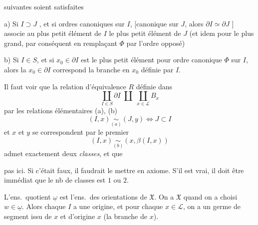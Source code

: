 \documentclass[11pt,a4paper]{article}
\begin{document}
suivantes soient satisfaites

a) Si $I \supset J$ , et si    ordres canoniques sur $I$,   [canonique sur $J$, alors $\partial I \simeq \partial J$ ] associe au plus petit élément de $I$ le plus petit élément de $J$ (et idem pour le plus grand, par conséquent en remplaçant $\Phi$ par l'ordre opposé)

b) Si $I \in S$, et si $x_0 \in \partial I$ \struck{\ill{}} est le plus petit élément pour  ordre canonique $\Phi$ sur $I$, alors la \add{\ill{}} $x_0 \in \partial I$ correspond la branche en $x_0$ définie par $I$.

Il faut voir que la relation d'équivalence $R$ définie dans
\[
  \coprod_{I \in S} \partial I \;\amalg\; \coprod_{x \in \mathcal{L}} B_x
\]
par les relations élémentaires (a), (b)
\[
  (I,x) \underset{(a)}{\sim} (J,y) \Longleftrightarrow J \subset I
\]
et $x$ et $y$ se correspondent par le premier
\[
  (I,x) \underset{(b)}{\sim} (x, \beta(I,x))
\]
admet exactement deux \emph{classes}, et que

\ill{} \ill{} pas \ill{}  ici. Si c'était faux, il faudrait le mettre en axiome. S'il est vrai, il doit être immédiat que  le nb de classes est $1$ ou $2$.

 L'ens.\ quotient $\underline{\omega}$ est l'ens.\ des orientations de $\mathfrak{X}$.  On a  $\mathfrak{X}$  quand on a choisi $w \in \underline{\omega}$. Alors chaque $I$ a une origine, et pour chaque $x \in \mathcal{L}$, on a un germe de segment issu de $x$  et d'origine $x$ (la branche  de $x$).
\end{document}
